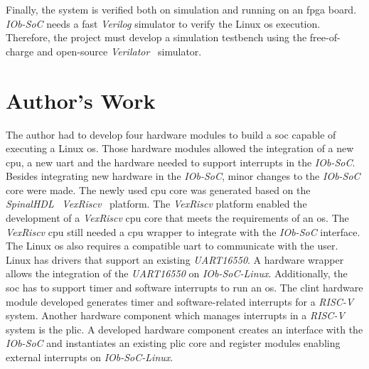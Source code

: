 Finally, the system is verified both on simulation and running on an \acrshort{fpga} board. \textit{IOb-SoC} needs a fast \textit{Verilog} simulator to verify the Linux \acrshort{os} execution. Therefore, the project must develop a simulation testbench using the free-of-charge and open-source \textit{Verilator}~\cite{snyder2010verilator} simulator.

\section{Author's Work}
\label{section:authors_work}
The author had to develop four hardware modules to build a \acrfull{soc} capable of executing a Linux \acrshort{os}. Those hardware modules allowed the integration of a new \acrshort{cpu}, a new \acrshort{uart} and the hardware needed to support interrupts in the \textit{IOb-SoC}. Besides integrating new hardware in the \textit{IOb-SoC}, minor changes to the \textit{IOb-SoC} core were made. The newly used \acrshort{cpu} core was generated based on the \textit{SpinalHDL}~\cite{papon2017spinalhdl} \textit{VexRiscv}~\cite{vexriscv} platform. The \textit{VexRiscv} platform enabled the development of a \textit{VexRiscv} \acrshort{cpu} core that meets the requirements of an \acrshort{os}. The \textit{VexRiscv} \acrshort{cpu} still needed a \acrshort{cpu} wrapper to integrate with the \textit{IOb-SoC} interface. The Linux \acrshort{os} also requires a compatible \acrshort{uart} to communicate with the user. Linux has drivers that support an existing \textit{UART16550}. A hardware wrapper allows the integration of the \textit{UART16550} on \textit{IOb-SoC-Linux}. Additionally, the \acrshort{soc} has to support timer and software interrupts to run an \acrshort{os}. The \acrshort{clint} hardware module developed generates timer and software-related interrupts for a \textit{RISC-V} system. Another hardware component which manages interrupts in a \textit{RISC-V} system is the \acrshort{plic}. A developed hardware component creates an interface with the \textit{IOb-SoC} and instantiates an existing \acrshort{plic} core and register modules enabling external interrupts on \textit{IOb-SoC-Linux}.

